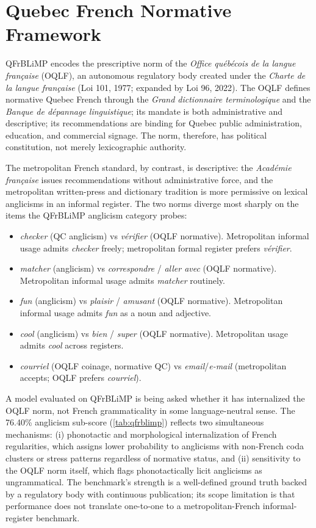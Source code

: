 \documentclass[11pt]{article}
\begin{document}
\section{Quebec French Normative Framework}
\label{app:qcfr}

QFrBLiMP encodes the prescriptive norm of the \textit{Office québécois de la langue fran\c{c}aise} (OQLF), an autonomous regulatory body created under the \emph{Charte de la langue fran\c{c}aise} (Loi 101, 1977; expanded by Loi 96, 2022). The OQLF defines normative Quebec French through the \emph{Grand dictionnaire terminologique} and the \emph{Banque de dépannage linguistique}; its mandate is both administrative and descriptive; its recommendations are binding for Quebec public administration, education, and commercial signage. The norm, therefore, has political constitution, not merely lexicographic authority.

The metropolitan French standard, by contrast, is descriptive: the\textit{ Académie fran\c{c}aise} issues recommendations without administrative force, and the metropolitan written-press and dictionary tradition is more permissive on lexical anglicisms in an informal register. The two norms diverge most sharply on the items the QFrBLiMP anglicism category probes:

\begin{itemize}
\setlength{\itemsep}{0pt}
\item \emph{checker} (QC anglicism) vs \emph{vérifier} (OQLF normative). Metropolitan informal usage admits \emph{checker} freely; metropolitan formal register prefers \emph{vérifier}.
\item \emph{matcher} (anglicism) vs \emph{correspondre} / \emph{aller avec} (OQLF normative). Metropolitan informal usage admits \emph{matcher} routinely.
\item \emph{fun} (anglicism) vs \emph{plaisir} / \emph{amusant} (OQLF normative). Metropolitan informal usage admits \emph{fun} as a noun and adjective.
\item \emph{cool} (anglicism) vs \emph{bien} / \emph{super} (OQLF normative). Metropolitan usage admits \emph{cool} across registers.
\item \emph{courriel} (OQLF coinage, normative QC) vs \emph{email}/\emph{e-mail} (metropolitan accepts; OQLF prefers \emph{courriel}).
\end{itemize}

A model evaluated on QFrBLiMP is being asked whether it has internalized the OQLF norm, not French grammaticality in some language-neutral sense. The 76.40\% anglicism sub-score (\autoref{tab:qfrblimp}) reflects two simultaneous mechanisms: (i) phonotactic and morphological internalization of French regularities, which assigns lower probability to anglicisms with non-French coda clusters or stress patterns regardless of normative status, and (ii) sensitivity to the OQLF norm itself, which flags phonotactically licit anglicisms as ungrammatical. The benchmark's strength is a well-defined ground truth backed by a regulatory body with continuous publication; its scope limitation is that performance does not translate one-to-one to a metropolitan-French informal-register benchmark.
\end{document}
